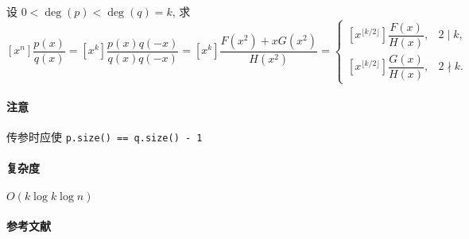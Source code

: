 设 \(0<\deg(p)<\deg(q)=k\), 求 \(\displaystyle\left[x^n\right]\dfrac{p(x)}{q(x)}=\left[x^k\right]\dfrac{p(x)q(-x)}{q(x)q(-x)}=\left[x^k\right]\dfrac{F\left(x^2\right)+xG\left(x^2\right)}{H\left(x^2\right)}=\begin{cases}
    \left[x^{\lfloor k/2\rfloor}\right]\dfrac{F(x)}{H(x)},&2\mid k,\\
    \left[x^{\lfloor k/2\rfloor}\right]\dfrac{G(x)}{H(x)},&2\nmid k.
\end{cases}\)

\paragraph{注意}

传参时应使 \verb|p.size() == q.size() - 1|

\paragraph{复杂度}

\(O(k\log k\log n)\)

\paragraph{参考文献} \cite{bostan2021simple}
